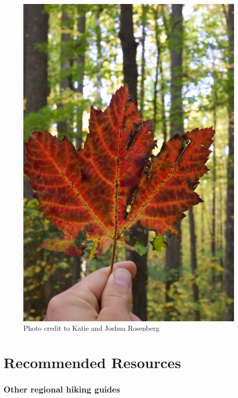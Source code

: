 \documentclass[
  letterpaper,
  DIV=11,
  numbers=noendperiod]{scrreprt}
\begin{document}
\begin{figure}[H]

{\centering \includegraphics[width=12.5in,height=\textheight,keepaspectratio]{img/maple leaf.jpeg}

}

\caption{Photo credit to Katie and Joshua Rosenberg}

\end{figure}%

\chapter{Recommended Resources}\label{recommended-resources}

\subsection{Other regional hiking
guides}\label{other-regional-hiking-guides}
\end{document}
